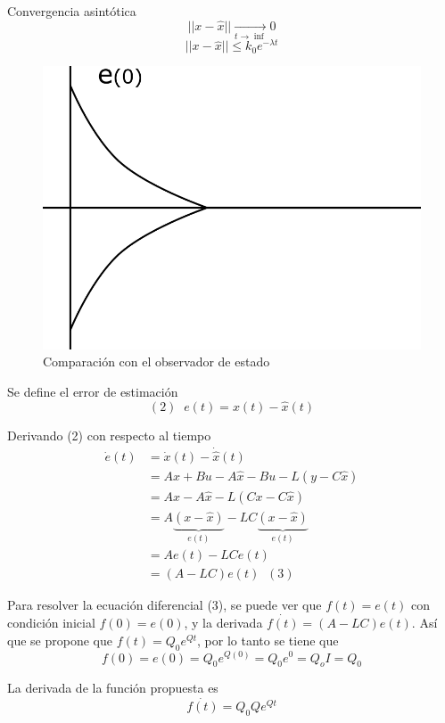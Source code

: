 Convergencia asintótica 
\[
    ||x - \hat{x}||\underset{t \to \inf}{\to} 0
\]
\[
    ||x-\hat{x}|| \le k_{0} e^{-\lambda t}
\]
\begin{figure}[h!]
    \centering
        \includegraphics[scale=0.25]{Control de Sistemas Mecatronicos Figuras/13 Convergencia Asintotica.png}
        \caption{Comparación con el observador de estado}
\end{figure}

Se define el error de estimación 
\[
    (2) \;\; e(t) = x(t) -\hat{x}(t)
\]

Derivando (2) con respecto al tiempo
\[
    \begin{split}
        \dot{e}(t) & = \dot{x}(t) -\dot{\hat{x}}(t) \\
        & = Ax + Bu -A\hat{x} - Bu - L(y - C \hat{x}) \\
        & = Ax-A\hat{x}-L(Cx -C\hat{x})\\
        & = A
        \underbrace{ (x-\hat{x}) }_{ e(t) } 
        - LC
        \underbrace{ (x-\hat{x}) }_{ e(t) } \\
        & = Ae(t) - LCe(t) \\
        & = (A-LC)e(t) \;\; (3)
    \end{split}
\]

Para resolver la ecuación diferencial (3), se puede ver que \(f(t) = e(t)\) con condición inicial \(f(0) = e(0) \), y la derivada \( \dot{f(t)} = (A-LC)e(t) \). Así que se propone que \( f(t) =Q_{0}e^{Qt} \), por lo tanto se tiene que
\[
    f(0) = e(0) = Q_{0}e^{Q(0)}=Q_{0}e^{0} = Q_{o}I = Q_{0}
\]

La derivada de la función propuesta es 
\[
    \dot{f(t)} = Q_{0}Qe^{Qt}
\]


